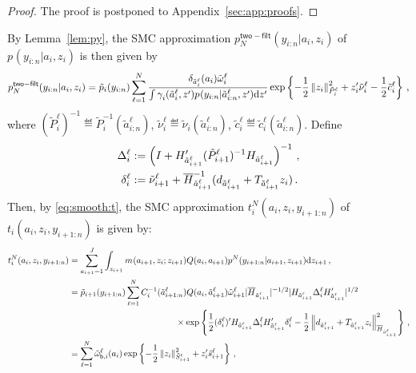 \begin{proof}
The proof is postponed to Appendix~\ref{sec:app:proofs}.
\end{proof}
By Lemma~\ref{lem:py}, the SMC approximation $p^{\mathsf{two-filt}}_{N}(y_{i:n}|a_{i},z_{i})$ of $p_{}(y_{i:n}|a_{i},z_{i})$ is then given by
\begin{equation}
\label{eq:pN:yi:n}
p^{\mathsf{two-filt}}_{N}(y_{i:n}|a_{i},z_{i}) = \tilde{p}_i(y_{i:n}) \sum_{\ell=1}^N  \frac{\delta_{\tilde{a}^{\ell}_i}(a_i)\tilde{\omega}_{i}^{\ell}}{\int \gamma^{}_{i}(\tilde{a}^{\ell}_i,z')p_{}(y_{i:n}|\tilde{a}^{\ell}_{i:n},z')\rmd z'} \exp\left\{- \frac{1}{2}\normMat{\tilde{P}^{\ell}_{i}}{z_i}^2 + z'_i\tilde{\nu}^{\ell}_{i} - \frac{1}{2} \tilde{c}^{\ell}_i \right\}\eqsp,
\end{equation}
where $(\tilde{P}^{\ell}_{i})^{-1} \eqdef \tilde{P}_{i}^{-1}(\tilde{a}^{\ell}_{i:n})$, $\tilde{\nu}^{\ell}_{i}\eqdef \tilde{\nu}_{i}(\tilde{a}^{\ell}_{i:n})$, $\tilde{c}^{\ell}_{i} \eqdef \tilde{c}^{\ell}_{i}(\tilde{a}^{\ell}_{i:n})$. Define
\begin{align*}
\Delta^{\ell}_{i} &:= \left(I + H'_{\tilde{a}^\ell_{i+1}}(\tilde{P}^{\ell}_{i+1})^{-1}H_{\tilde{a}^\ell_{i+1}}\right)^{-1}\,,\\
\delta^{\ell}_{i}&:=\tilde{\nu}^{\ell}_{i+1} + \overline{H}_{\tilde{a}^\ell_{i+1}}^{-1}(d_{\tilde{a}^\ell_{i+1}}+T_{\tilde{a}^\ell_{i+1}}z_i)\,.
\end{align*}
Then, by \eqref{eq:smooth:t}, the SMC approximation $t^N_{i}(a_i,z_i,y_{i+1:n})$ of $t_{i}(a_i,z_i,y_{i+1:n})$ is given by:
\begin{align}
t^N_{i}(a_i,z_i,y_{i+1:n}) &=\sum_{a_{i+1}=1}^J\int_{z_{i+1}}m_{}(a_{i+1},z_{i};z_{i+1})Q(a_{i},a_{i+1})p^N_{}(y_{i+1:n}|a_{i+1},z_{i+1}) \rmd z_{i+1}\eqsp,\nonumber\\
&=  \tilde{p}_{i+1}(y_{i+1:n}) \sum_{\ell=1}^N C_i^{-1}(\tilde{a}^{\ell}_{i+1:n}) Q(a_i, \tilde{a}^{\ell}_{i+1}) \tilde{\omega}^{\ell}_{i+1} |\barH_{\tilde{a}^{\ell}_{i+1}}|^{-1/2} |H_{\tilde{a}^{\ell}_{i+1}} \Delta^{\ell}_i H'_{\tilde{a}^{\ell}_{i+1}}|^{1/2} \eqsp\nonumber \\
&\hspace{4.3cm} \times \exp\left\{\frac{1}{2} (\delta^{\ell}_i)'H_{\tilde{a}^{\ell}_{i+1}}\Delta^{\ell}_iH'_{\tilde{a}^{\ell}_{i+1}} \delta^{\ell}_i -\frac{1}{2}\normMat{\barH_{\tilde{a}^{\ell}_{i+1}}}{d_{\tilde{a}^{\ell}_{i+1}}+T_{\tilde{a}^{\ell}_{i+1}}z_i}^2\right\} \eqsp,\\
&= \sum_{\ell=1}^N\tilde{\omega}_{\mathsf{b},i}^\ell(a_i)\exp\left\{-\frac{1}{2}\normMat{\tilde{S}_{i+1}^\ell}{z_i}^2+z_i'\tilde{s}_{i+1}^\ell\right\}\eqsp,\label{eq:tN}
\end{align}
